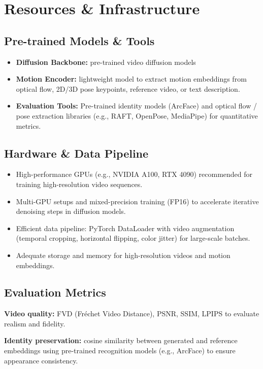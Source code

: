 \documentclass[11pt,a4paper]{article}
\begin{document}
\section{Resources \& Infrastructure}
\subsection{Pre-trained Models \& Tools}
\begin{itemize}
    \item \textbf{Diffusion Backbone:} pre-trained video diffusion models 
    \item \textbf{Motion Encoder:} lightweight model to extract motion embeddings from optical flow, 2D/3D pose keypoints, reference video, or text description.
    \item \textbf{Evaluation Tools:} Pre-trained identity models (ArcFace) and optical flow / pose extraction libraries (e.g., RAFT, OpenPose, MediaPipe) for quantitative metrics.
\end{itemize}

\subsection{Hardware \& Data Pipeline}
\begin{itemize}
    \item High-performance GPUs (e.g., NVIDIA A100, RTX 4090) recommended for training high-resolution video sequences.
    \item Multi-GPU setups and mixed-precision training (FP16) to accelerate iterative denoising steps in diffusion models.
    \item Efficient data pipeline: PyTorch DataLoader with video augmentation (temporal cropping, horizontal flipping, color jitter) for large-scale batches.
    \item Adequate storage and memory for high-resolution videos and motion embeddings.
\end{itemize}

\subsection{Evaluation Metrics}

\hspace*{1.5em}\textbf{Video quality:} FVD (Fréchet Video Distance), PSNR, SSIM, LPIPS to evaluate realism and fidelity.

\textbf{Identity preservation:} cosine similarity between generated and reference embeddings using pre-trained recognition models (e.g., ArcFace) to ensure appearance consistency.
\end{document}
